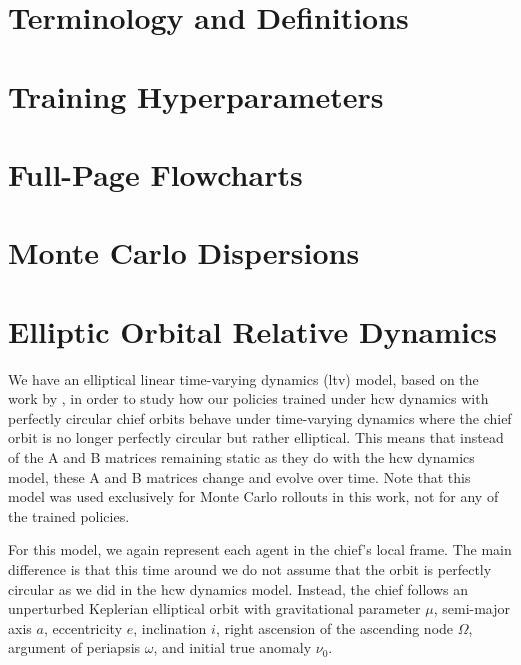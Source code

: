 \chapter{Terminology and Definitions}
\label{appendix:glossary}



\chapter{Training Hyperparameters}
\label{appendix:hyperparameters}



\chapter{Full-Page Flowcharts}
\label{app:full_page_flowcharts}



\chapter{Monte Carlo Dispersions}
\label{appendix:dispersions}




\chapter{Elliptic Orbital Relative Dynamics}
\label{appendix:dynamics-elliptic-ltv}

We have an elliptical linear time-varying dynamics (\acs{ltv}) model, based on the work by \cite{tschauner1965rendezvous}, in order to study how our policies trained under \acs{hcw} dynamics with perfectly circular chief orbits behave under time-varying dynamics where the chief orbit is no longer perfectly circular but rather elliptical. This means that instead of the A and B matrices remaining static as they do with the \acs{hcw} dynamics model, these A and B matrices change and evolve over time. Note that this model was used exclusively for Monte Carlo rollouts in this work, not for any of the trained policies.

For this model, we again represent each agent in the chief's local frame. The main difference is that this time around we do not assume that the orbit is perfectly circular as we did in the \acs{hcw} dynamics model. Instead, the chief follows an unperturbed Keplerian elliptical orbit with gravitational parameter $\mu$, semi-major axis $a$, eccentricity $e$, inclination $i$, right ascension of the ascending node $\Omega$, argument of periapsis $\omega$, and initial true anomaly $\nu_0$.


